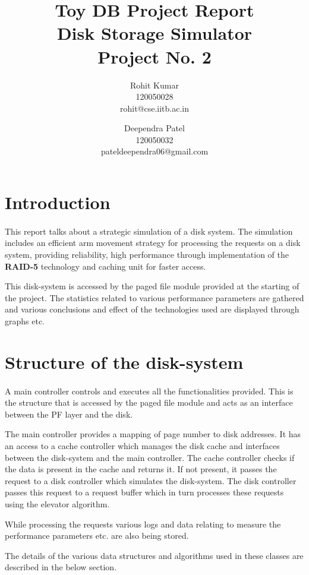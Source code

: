 \documentclass[11pt]{article}
\title{\textbf{Toy DB Project Report \\ 
	Disk Storage Simulator \\
	Project No. 2 }}
\author{Rohit Kumar \\ 120050028 \\ rohit@cse.iitb.ac.in
		\and 
		Deependra Patel \\ 120050032 \\ pateldeependra06@gmail.com
		}
\date{}
\begin{document}
\maketitle

\section{Introduction}
\paragraph{}
	This report talks about a strategic simulation of a disk system. The simulation includes an efficient arm movement strategy for processing the requests on a disk system, providing reliability, high performance through implementation of the \textbf{RAID-5} technology and caching unit for faster access. 

This disk-system is accessed by the paged file module provided at the starting of the project. The statistics related to various performance parameters are gathered and various conclusions and effect of the technologies used are displayed through graphs etc.
	
\section{Structure of the disk-system}
\paragraph{}
A main controller controls and executes all the functionalities provided. This is the structure that is accessed by the paged file module and acts as an interface between the PF layer and the disk.

The main controller provides a mapping of page number to disk addresses. It has an access to a cache controller which manages the disk cache and interfaces between the disk-system and the main controller. The cache controller checks if the data is present in the cache and returns it. If not present, it passes the request to a disk controller which simulates the disk-system. The disk controller passes this request to a request buffer which in turn processes these requests using the elevator algorithm.

While processing the requests various logs and data relating to measure the performance parameters etc. are also being stored.

The details of the various data structures and algorithms used in these classes are described in the below section.
\end{document}
